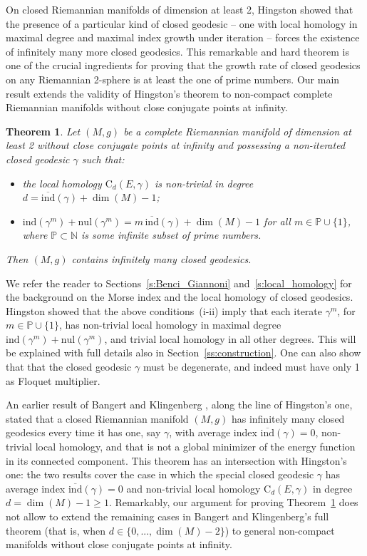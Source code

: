 \documentclass[reqno]{amsart}
\numberwithin{equation}{section}
\theoremstyle{personal}%
\newtheorem{thm}{Theorem}[section]
\theoremstyle{definition}
\newcommand{\N}{\mathds{N}}
\newcommand{\PP}{\mathds{P}}
\newcommand{\Loc}{\mathrm{C}}
\newcommand{\avind}{\overline{\ind}}
\newcommand{\ind}{\mathrm{ind}}
\newcommand{\nul}{\mathrm{nul}}
\begin{document}
On closed Riemannian manifolds of dimension at least 2, Hingston \cite{Hingston:1993ou} showed that the presence of a particular kind of closed geodesic -- one with local homology in maximal degree and maximal index growth under iteration -- forces the existence of infinitely many more closed geodesics. This remarkable and hard theorem is one of the crucial ingredients for proving that the growth rate of closed geodesics on any Riemannian 2-sphere is at least the one of prime numbers. 
Our main result extends the validity of Hingston's theorem to non-compact complete Riemannian manifolds without close conjugate points at infinity. 

\begin{thm}\label{t:main}
Let $(M,g)$ be a complete Riemannian manifold of dimension at least 2 without close conjugate points at infinity and possessing a non-iterated closed geodesic $\gamma$ such that:
\begin{itemize}
\item[(i)] the local homology $\Loc_d(E,\gamma)$ is non-trivial in degree $d=\avind(\gamma)+\dim(M)-1$;
\item[(ii)] $\ind(\gamma^m)+\nul(\gamma^m)=m\,\avind(\gamma)+\dim(M)-1$ for all $m\in\PP\cup\{1\}$, where $\PP\subset\N$ is some infinite subset of prime numbers.
\end{itemize}
Then $(M,g)$ contains infinitely many closed geodesics.
\end{thm}

We refer the reader to Sections~\ref{s:Benci_Giannoni} and~\ref{s:local_homology} for the background on the Morse index and the local homology of closed geodesics.
Hingston showed that the above conditions~(i-ii) imply that each iterate $\gamma^m$, for $m\in\PP\cup\{1\}$, has non-trivial local homology in maximal degree $\ind(\gamma^m)+\nul(\gamma^m)$, and trivial local homology in all other degrees. This will be explained with full details also in Section~\ref{ss:construction}. One can also show that that the closed geodesic $\gamma$ must be degenerate, and indeed must have only 1 as Floquet multiplier.



An earlier result of Bangert and Klingenberg \cite[Theorem~3]{Bangert:1983ax}, along the line of Hingston's one, stated that a closed Riemannian manifold $(M,g)$ has infinitely many closed geodesics every time it has one, say $\gamma$, with average index $\avind(\gamma)=0$, non-trivial local homology, and that is not a global minimizer of the energy function in its connected component. This theorem has an intersection with Hingston's one: the two results cover the case in which the special closed geodesic $\gamma$ has average index $\avind(\gamma)=0$ and non-trivial local homology $\Loc_d(E,\gamma)$ in degree $d=\dim(M)-1\geq1$. Remarkably, our argument for proving Theorem~\ref{t:main} does not allow to extend the remaining cases in Bangert and Klingenberg's full theorem (that is, when $d\in\{0,...,\dim(M)-2\}$) to general non-compact manifolds without close conjugate points at infinity.
\end{document}
